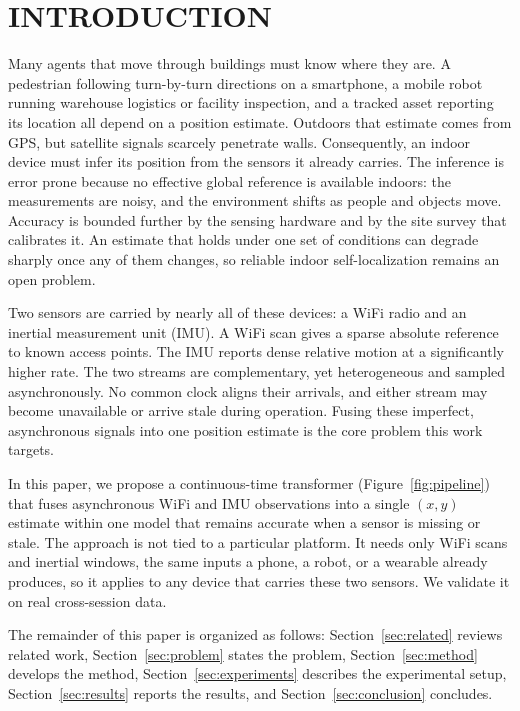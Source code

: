\section{\uppercase{Introduction}}

\noindent Many agents that move through buildings must know where they are. A pedestrian
following turn-by-turn directions on a smartphone, a mobile robot running
warehouse logistics or facility inspection, and a tracked asset reporting its
location all depend on a position estimate. Outdoors that estimate comes from
GPS, but satellite signals scarcely penetrate walls. Consequently, an indoor device must
infer its position from the sensors it already carries. The inference is
error prone because no effective global reference is available indoors: the
measurements are noisy, and the environment shifts as people and objects move.
Accuracy is bounded further by the sensing hardware and by the site survey that
calibrates it. An estimate that holds under one set of conditions can degrade
sharply once any of them changes, so reliable indoor self-localization remains an
open problem.

Two sensors are carried by nearly all of these devices: a WiFi radio and an
inertial measurement unit (IMU). A WiFi scan gives a sparse absolute reference to
known access points. The IMU reports dense relative motion at a significantly higher rate.
The two streams are complementary, yet heterogeneous and sampled asynchronously.
No common clock aligns their arrivals, and either stream may become unavailable or arrive
stale during operation. Fusing these imperfect, asynchronous signals into one
position estimate is the core problem this work targets.

In this paper, we propose a continuous-time transformer (Figure~\ref{fig:pipeline})
that fuses asynchronous WiFi and IMU observations into a single $(x, y)$ estimate
within one model that remains accurate when a sensor is missing or stale. The
approach is not tied to a particular platform. It needs only WiFi scans and
inertial windows, the same inputs a phone, a robot, or a wearable already produces,
so it applies to any device that carries these two sensors. We validate it on real
cross-session data.

The remainder of this paper is organized as follows: Section~\ref{sec:related}
reviews related work, Section~\ref{sec:problem} states the problem,
Section~\ref{sec:method} develops the method, Section~\ref{sec:experiments}
describes the experimental setup, Section~\ref{sec:results} reports the results,
and Section~\ref{sec:conclusion} concludes.
